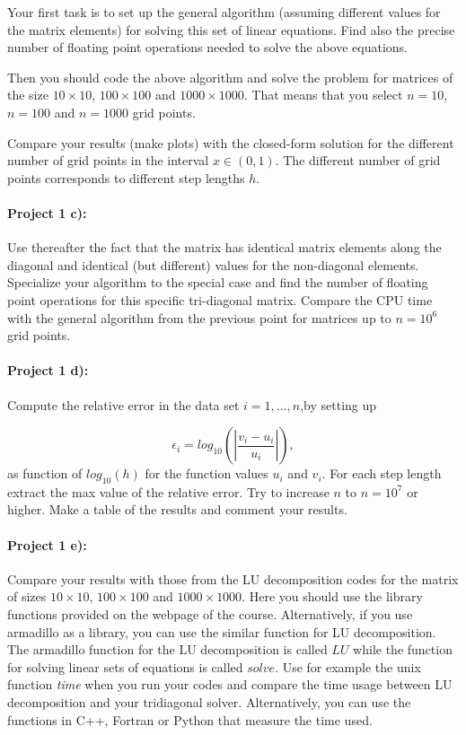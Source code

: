 \documentclass[%
oneside,                 %
final,                   %
10pt]{article}
\begin{document}
Your first task is to set up the general algorithm (assuming different values for the matrix elements) for solving this set of linear equations.
Find also the precise number of floating point 
operations needed to solve the above equations. 


Then you should code the above algorithm and solve the problem for matrices of the size
$10\times 10$, $100\times 100$ and $1000\times 1000$.  That means that you select $n=10$, $n=100$ and
$n=1000$ grid points. 

Compare your results (make plots) with the closed-form solution for the different number of grid points  in the 
interval $x\in(0,1)$.  The different number of grid points corresponds to different step lengths $h$.

\paragraph{Project 1 c):}
Use thereafter the fact that the matrix has identical matrix elements along the diagonal and identical (but different) values for the non-diagonal elements. Specialize your algorithm to the special case and find the number of floating point operations
for this specific tri-diagonal matrix. Compare the CPU time with the general algorithm from the previous point for matrices up to  $n=10^6$ grid points. 

\paragraph{Project 1 d):}
Compute the relative error  in the data set $i=1,\dots, n$,by setting up

\[
   \epsilon_i=log_{10}\left(\left|\frac{v_i-u_i}
                 {u_i}\right|\right),
\]
as function of $log_{10}(h)$ for the function values $u_i$ and $v_i$.
For each step length extract the max value of the relative error.  
Try to increase $n$ to $n=10^7$ or higher.  Make a table of the results and 
comment your results. 

\paragraph{Project 1 e):}
Compare your results with those from the LU decomposition codes for the matrix of sizes $10\times 10$, $100\times 100$ and
$1000\times 1000$. Here you should use the library functions provided  on the webpage of the course. Alternatively, if you use armadillo as a library, you can use the similar function for LU decomposition.  The armadillo function for the LU decomposition is called $LU$ while the function for solving linear sets of equations is called $solve$.
Use for example the unix function \emph{time} when you run your codes 
and compare the time usage between LU decomposition and  your
tridiagonal solver.   Alternatively, you can use the functions in C++, Fortran or Python that measure the time used. 
\end{document}
